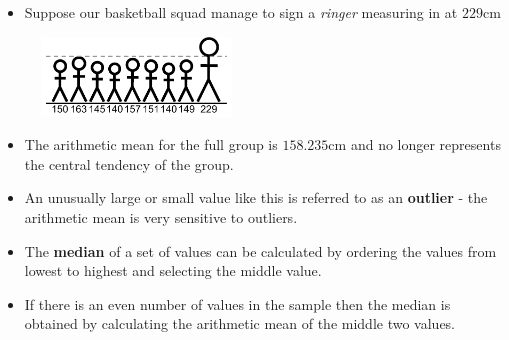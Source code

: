 \documentclass[xcolor={table}]{beamer}
\newcommand{\keyword}[1]{\alert{\textbf{#1}}\index{#1}}
\begin{document}
\begin{frame} 
	\begin{example}
		\begin{itemize}
			\item Suppose our basketball squad manage to sign a \textit{ringer} measuring in at $229$cm 
		\end{itemize}
		\begin{figure}[!htb]
			\includegraphics[width=0.45\textwidth]{./images/DataEx-DesriptiveStatsPuppetShowBigManPlusHeightsFixed}
			\label{fig:descriptiveStatsTeamExtraBigMan}
		\end{figure}
		\begin{itemize}
			\item The arithmetic mean for the full group is $158.235$cm and no longer represents the central tendency of the group.  
			\item An unusually large or small value like this is referred to as an \keyword{outlier} - the arithmetic mean is very sensitive to outliers. 
		\end{itemize}
	\end{example}
\end{frame} 

\begin{frame} 
\begin{itemize}
\item The \keyword{median} of a set of values can be calculated by ordering the values from lowest to highest and selecting the middle value. 
\item If there is an even number of values in the sample then the median is obtained by calculating the arithmetic mean of the middle two values. 
\end{itemize}
\end{frame} 
\end{document}

